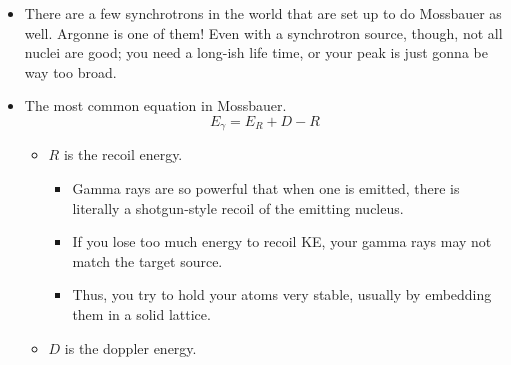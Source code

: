 \documentclass[../notes.tex]{subfiles}
\begin{document}
\begin{itemize}
\begin{table}[h!]
\begin{tabular}{ccccc}
        \end{tabular}
        \caption{Typical Mossbauer gamma ray source nuclei.}
        \label{tab:MossbauerSources}
    \end{table}
    \begin{itemize}
        \item 90\% or more of Mossbauer is done with .
        \begin{itemize}
            \item At \SI{14.4}{\kilo\electronvolt}, it's a pretty hot but not super hot $\gamma$ ray.
            \item The cobalt precursor nucleus comes from Russia, so a lot of Mossbauer spectroscopists are probably looking at very lean times right now.
        \end{itemize}
        \item {} is also pretty common.
        \begin{itemize}
            \item With respect to the precursor nucleus, 119m means a \textbf{metastable} state of tin.
        \end{itemize}
    \end{itemize}
    \item There are a few synchrotrons in the world that are set up to do Mossbauer as well. Argonne is one of them! Even with a synchrotron source, though, not all nuclei are good; you need a long-ish life time, or your peak is just gonna be way too broad.
    \item The most common equation in Mossbauer.
    \begin{equation*}
        E_\gamma = E_R+D-R
    \end{equation*}
    \begin{itemize}
        \item $R$ is the recoil energy.
        \begin{itemize}
            \item Gamma rays are so powerful that when one is emitted, there is literally a shotgun-style recoil of the emitting nucleus.
            \item If you lose too much energy to recoil KE, your gamma rays may not match the target source.
            \item Thus, you try to hold your atoms very stable, usually by embedding them in a solid lattice.
        \end{itemize}
        \item $D$ is the doppler energy.

\end{itemize}
\end{itemize}
\end{document}
